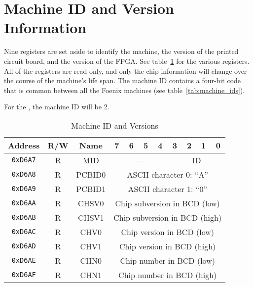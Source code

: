 \section*{Machine ID and Version Information}

Nine registers are set aside to identify the machine, the version of the printed circuit board, and the version of the FPGA. See table~\ref{tab:machine_id_ver} for the various registers. All of the registers are read-only, and only the chip information will change over the course of the machine's life span. The machine ID contains a four-bit code that is common between all the Foenix machines (see table~\ref{tab:machine_ids}).

For the \jr, the machine ID will be 2.

\begin{table}[ht]
    \begin{center}
        \begin{tabular}{|c|c|c|c|c|c|c|c|c|c|c|} \hline
            Address & R/W & Name & 7 & 6 & 5 & 4 & 3 & 2 & 1 & 0 \\\hline\hline
            \verb+0xD6A7+ & R & MID & \multicolumn{4}{|c|}{---} & \multicolumn{4}{|c|}{ID} \\ \hline

            \verb+0xD6A8+ & R & PCBID0 & \multicolumn{8}{|c|}{ASCII character 0: ``A''} \\ \hline
            \verb+0xD6A9+ & R & PCBID1 & \multicolumn{8}{|c|}{ASCII character 1: ``0''} \\ \hline

            \verb+0xD6AA+ & R & CHSV0 & \multicolumn{8}{|c|}{Chip subversion in BCD (low)} \\ \hline
            \verb+0xD6AB+ & R & CHSV1 & \multicolumn{8}{|c|}{Chip subversion in BCD (high)} \\ \hline
            \verb+0xD6AC+ & R & CHV0 & \multicolumn{8}{|c|}{Chip version in BCD (low)} \\ \hline
            \verb+0xD6AD+ & R & CHV1 & \multicolumn{8}{|c|}{Chip version in BCD (high)} \\ \hline
            \verb+0xD6AE+ & R & CHN0 & \multicolumn{8}{|c|}{Chip number in BCD (low)} \\ \hline
            \verb+0xD6AF+ & R & CHN1 & \multicolumn{8}{|c|}{Chip number in BCD (high)} \\ \hline
        \end{tabular}
    \end{center}
    \caption{Machine ID and Versions}
    \label{tab:machine_id_ver}
\end{table}

